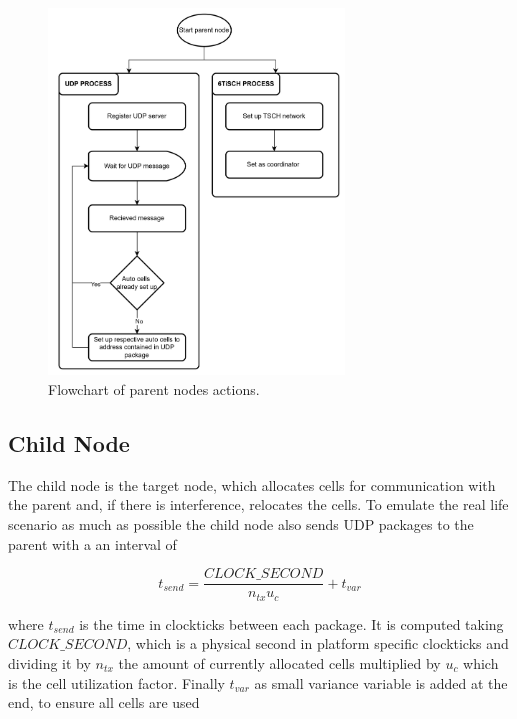 \documentclass{comnets-thesis}
\begin{document}
\begin{figure}[H]
    \centering
    \includegraphics[width=0.7\textwidth]{./images/parent-node-flowchart.png}
    \caption{Flowchart of parent nodes actions.}
    \label{fig:parent-node-flowchart}
\end{figure}


\subsection*{Child Node}
The child node is the target node, which allocates cells for communication with the parent and, if there is interference, relocates the cells. To emulate the real life scenario as much as possible the child node also sends UDP packages to the parent with a an interval of

\begin{equation}
    t_{send} = \frac{CLOCK\_SECOND}{n_{tx}u_c} + t_{var}
\end{equation}

where $t_{send}$ is the time in clockticks between each package. It is computed taking $CLOCK\_SECOND$, which is a physical second in platform specific clockticks and dividing it by $n_{tx}$ the amount of currently allocated cells multiplied by $u_c$ which is the cell utilization factor. Finally $t_{var}$ as small variance variable is added at the end, to ensure all cells are used
\end{document}

